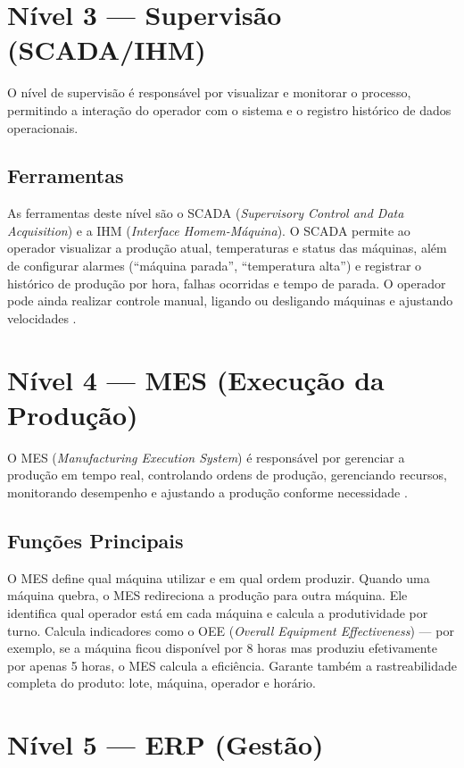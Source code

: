 \documentclass[12pt,a4paper,oneside]{article}
\begin{document}
\section{Nível 3 --- Supervisão (SCADA/IHM)}

O nível de supervisão é responsável por visualizar e monitorar o processo, permitindo a interação do operador com o sistema e o registro histórico de dados operacionais.

\subsection{Ferramentas}

As ferramentas deste nível são o SCADA (\textit{Supervisory Control and Data Acquisition}) e a IHM (\textit{Interface Homem-Máquina}). O SCADA permite ao operador visualizar a produção atual, temperaturas e status das máquinas, além de configurar alarmes (``máquina parada'', ``temperatura alta'') e registrar o histórico de produção por hora, falhas ocorridas e tempo de parada. O operador pode ainda realizar controle manual, ligando ou desligando máquinas e ajustando velocidades \cite{senai2014}.

\section{Nível 4 --- MES (Execução da Produção)}

O MES (\textit{Manufacturing Execution System}) é responsável por gerenciar a produção em tempo real, controlando ordens de produção, gerenciando recursos, monitorando desempenho e ajustando a produção conforme necessidade \cite{caiçara2015}.

\subsection{Funções Principais}

O MES define qual máquina utilizar e em qual ordem produzir. Quando uma máquina quebra, o MES redireciona a produção para outra máquina. Ele identifica qual operador está em cada máquina e calcula a produtividade por turno. Calcula indicadores como o OEE (\textit{Overall Equipment Effectiveness}) --- por exemplo, se a máquina ficou disponível por 8 horas mas produziu efetivamente por apenas 5 horas, o MES calcula a eficiência. Garante também a rastreabilidade completa do produto: lote, máquina, operador e horário.

\section{Nível 5 --- ERP (Gestão)}
\end{document}
